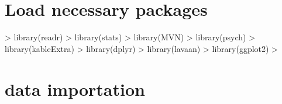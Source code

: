 \documentclass{article}
\begin{document}


\section{Load necessary packages}
\begin{Schunk}
\begin{Sinput}
> library(readr)
> library(stats)
> library(MVN)
> library(psych)
> library(kableExtra)
> library(dplyr)
> library(lavaan)
> library(ggplot2)
> 
\end{Sinput}
\end{Schunk}

\section{data importation}
\end{document}
